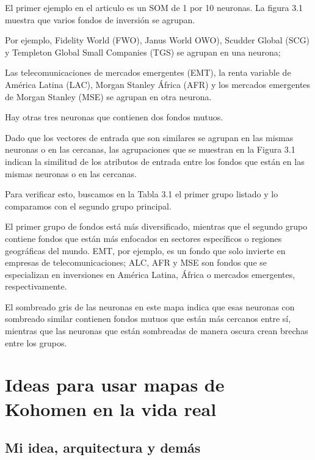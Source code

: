 \documentclass[fleqn, journal, onecolumn]{IEEEtran}             %
\theoremstyle{break}                                            %
\begin{document}
        El primer ejemplo en el articulo es un SOM de 1 por 10 neuronas. 
        La figura 3.1 muestra que varios fondos de inversión se agrupan. 
        
        Por ejemplo, Fidelity World (FWO), Janus World OWO), Scudder Global (SCG) y Templeton 
        Global Small Companies (TGS) se agrupan en una neurona; 
        
        Las telecomunicaciones de mercados emergentes (EMT), la renta variable de América Latina (LAC), 
        Morgan Stanley África (AFR) y los mercados emergentes de Morgan Stanley (MSE) se 
        agrupan en otra neurona. 
        
        Hay otras tres neuronas que contienen dos fondos mutuos. 
        
        Dado que los vectores de entrada que son similares se agrupan en las mismas neuronas o 
        en las cercanas, las agrupaciones que se muestran en la Figura 3.1 indican la similitud 
        de los atributos de entrada entre los fondos que están en las mismas neuronas o en las cercanas.
        
        Para verificar esto, buscamos en la Tabla 3.1 el primer grupo listado y lo
        comparamos con el segundo grupo principal. 
        
        El primer grupo de fondos está más diversificado, mientras que el segundo grupo contiene
        fondos que están más enfocados en sectores específicos o regiones geográficas del mundo.
        EMT, por ejemplo, es un fondo que solo invierte en empresas de telecomunicaciones; ALC, AFR
        y MSE son fondos que se especializan en inversiones en América Latina, África 
        o mercados emergentes, respectivamente. 
        
        El sombreado gris de las neuronas en este mapa indica que esas neuronas con sombreado
        similar contienen fondos mutuos que están más cercanos entre sí, mientras que las 
        neuronas que están sombreadas de manera oscura crean brechas entre los grupos.


    \section{Ideas para usar mapas de Kohomen en la vida real}

        

      \subsection{Mi idea, arquitectura y demás}
\end{document}
